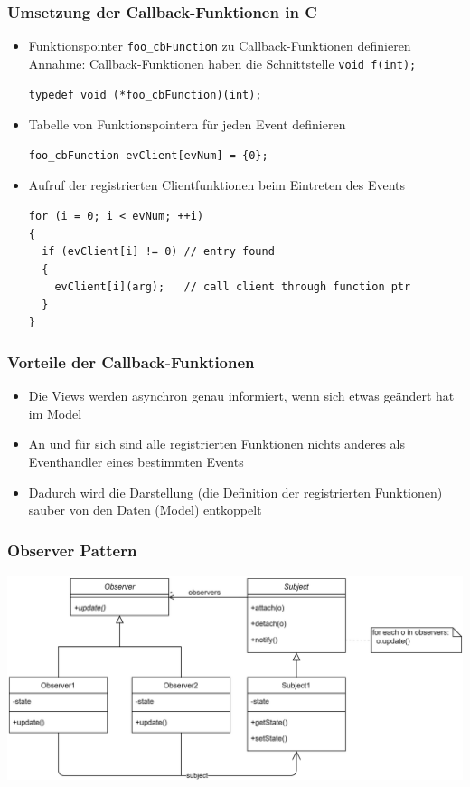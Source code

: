 \subsubsection{Umsetzung der Callback-Funktionen in C}
\begin{itemize}
	\item Funktionspointer \lstinline[style=C]{foo_cbFunction} zu Callback-Funktionen definieren\\
	      Annahme: Callback-Funktionen haben die Schnittstelle \lstinline[style=C]{void f(int);}
	      \begin{lstlisting}[style=C]
typedef void (*foo_cbFunction)(int);
	\end{lstlisting}

	\item Tabelle von Funktionspointern für jeden Event definieren
	      \begin{lstlisting}[style=C]
foo_cbFunction evClient[evNum] = {0};
	\end{lstlisting}

	\item Aufruf der registrierten Clientfunktionen beim Eintreten des Events
	      \begin{lstlisting}[style=C]
for (i = 0; i < evNum; ++i)
{
  if (evClient[i] != 0) // entry found
  {
    evClient[i](arg);   // call client through function ptr
  }
}
	\end{lstlisting}
\end{itemize}

\subsubsection{Vorteile der Callback-Funktionen}
\begin{itemize}
	\item Die Views werden asynchron genau informiert, wenn sich etwas geändert hat im Model
	\item An und für sich sind alle registrierten Funktionen nichts anderes als Eventhandler eines bestimmten Events
	\item Dadurch wird die Darstellung (die Definition der registrierten Funktionen) sauber von den Daten (Model) entkoppelt
\end{itemize}

\subsubsection{Observer Pattern}
\includegraphics[height=6cm]{images/EventBasedSystems/ObserverPattern.png}